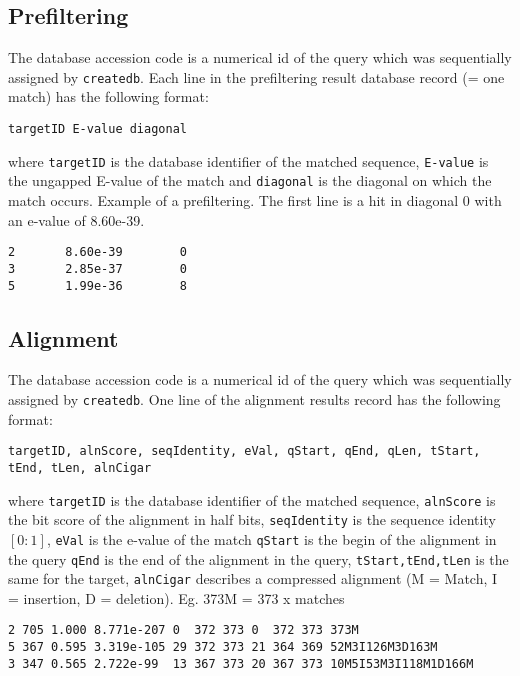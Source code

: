 \documentclass[11pt,a4paper]{scrreprt}
\begin{document}
\subsection{Prefiltering}
The database accession code is a numerical id of the query which was sequentially assigned by \texttt{createdb}. 
Each line in the prefiltering result database record (= one match) has the following format:

\begin{verbatim}
targetID E-value diagonal
\end{verbatim}

where \texttt{targetID} is the database identifier of the matched sequence, \texttt{E-value} is the ungapped E-value of the match and \texttt{diagonal} is the diagonal on which the match occurs. Example of a prefiltering. The first line is a hit in diagonal 0 with an e-value of 8.60e-39.

\begin{verbatim}
2       8.60e-39        0
3       2.85e-37        0
5       1.99e-36        8
\end{verbatim}

\subsection{Alignment}
The database accession code is a numerical id of the query which was sequentially assigned by \texttt{createdb}. 
One line of the alignment results record has the following format:

\begin{verbatim}
targetID, alnScore, seqIdentity, eVal, qStart, qEnd, qLen, tStart, tEnd, tLen, alnCigar
\end{verbatim}

where \texttt{targetID} is the database identifier of the matched sequence, \texttt{alnScore} is the bit score of the alignment in half bits, \texttt{seqIdentity} is the sequence identity $[0:1]$, \texttt{eVal} is the e-value of the match \texttt{qStart} is the begin of the alignment in the query \texttt{qEnd} is the end of the alignment in the query, 
 \texttt{tStart,tEnd,tLen} is the same for the target, \texttt{alnCigar} describes a compressed alignment (M = Match, I = insertion, D = deletion). Eg. 373M = 373 x matches

\begin{verbatim}
2 705 1.000 8.771e-207 0  372 373 0  372 373 373M
5 367 0.595 3.319e-105 29 372 373 21 364 369 52M3I126M3D163M
3 347 0.565 2.722e-99  13 367 373 20 367 373 10M5I53M3I118M1D166M
\end{verbatim}
\end{document}
